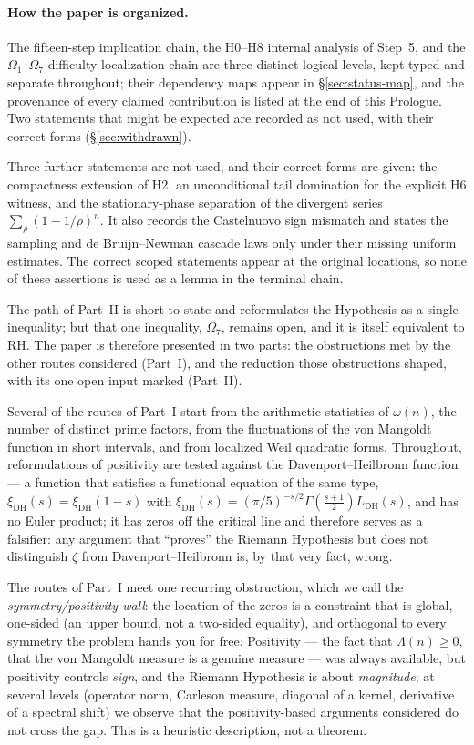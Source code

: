 \documentclass[11pt]{amsart}
\theoremstyle{definition}
\theoremstyle{remark}
\theoremstyle{definition}
\begin{document}
\paragraph{How the paper is organized.}  The fifteen-step implication chain, the H0--H8 internal analysis of
Step~5, and the $\Omega_1$--$\Omega_7$ difficulty-localization chain are three distinct logical levels,
kept typed and separate throughout; their dependency maps appear in \S\ref{sec:status-map},
and the provenance of every claimed contribution is listed at the end of this Prologue.  Two statements that
might be expected are recorded as not used, with their correct forms (\S\ref{sec:withdrawn}).

Three further statements are not used, and their correct forms are given: the compactness extension
of H2, an unconditional tail domination for the explicit H6 witness, and the
stationary-phase separation of the divergent series $\sum_\rho(1-1/\rho)^n$.  It also records the Castelnuovo sign mismatch and
states the sampling and de Bruijn--Newman cascade laws only under their missing uniform estimates.  The
correct scoped statements appear at the original locations, so none of these assertions is used as a
lemma in the terminal chain.

\medskip

The path of Part~II is short to state and reformulates the Hypothesis as a single inequality; but that
one inequality, $\Omega_7$, remains open, and it is itself equivalent to RH. The paper is therefore
presented in two parts: the obstructions met by the other routes considered (Part~I), and the
reduction those obstructions shaped, with its one open input marked (Part~II).

Several of the routes of Part~I start from the arithmetic statistics of $\omega(n)$, the number of
distinct prime factors, from the fluctuations of the von Mangoldt function in short intervals, and from
localized Weil quadratic forms. Throughout, reformulations of positivity are tested against the
Davenport--Heilbronn function --- a function that satisfies a functional equation of the same type, $\xi_{\mathrm{DH}}(s)=\xi_{\mathrm{DH}}(1-s)$ with $\xi_{\mathrm{DH}}(s)=(\pi/5)^{-s/2}\Gamma(\tfrac{s+1}2)L_{\mathrm{DH}}(s)$, and has no Euler product; it has zeros off the critical line and therefore serves as a
falsifier: any argument that ``proves'' the Riemann Hypothesis but does not distinguish $\zeta$ from
Davenport--Heilbronn is, by that very fact, wrong.

The routes of Part~I meet one recurring obstruction, which we call the
\emph{symmetry/positivity wall}: the location of the zeros is a constraint that is global, one-sided (an
upper bound, not a two-sided equality), and orthogonal to every symmetry the problem hands you for free.
Positivity --- the fact that $\Lambda(n)\ge0$, that the von Mangoldt measure is a genuine measure ---
was always available, but positivity controls \emph{sign}, and the Riemann Hypothesis is about
\emph{magnitude}; at several levels (operator norm, Carleson measure, diagonal of a kernel, derivative of
a spectral shift) we observe that the positivity-based arguments considered do not cross the gap.  This
is a heuristic description, not a theorem.
\end{document}
